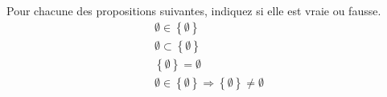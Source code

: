 Pour chacune des propositions suivantes, indiquez si elle est vraie ou fausse.
\begin{align*}
 \emptyset \in \left\lbrace \emptyset \right\rbrace\\ 
 \emptyset \subset \left\lbrace \emptyset \right\rbrace \\
 \left\lbrace \emptyset \right\rbrace = \emptyset \\
 \emptyset \in \left\lbrace \emptyset \right\rbrace \Rightarrow \left\lbrace \emptyset \right\rbrace \neq \emptyset 
\end{align*}
